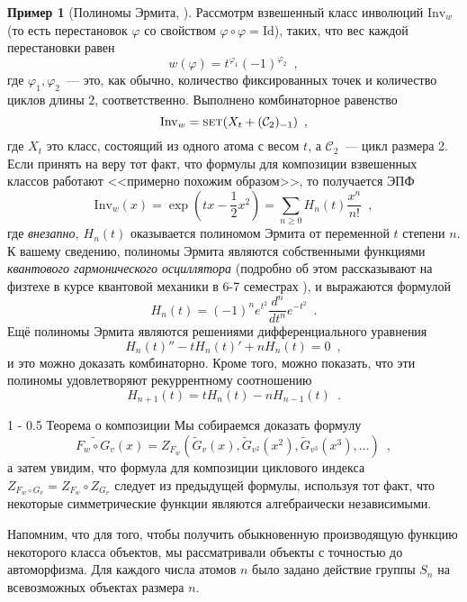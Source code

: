 \documentclass[a5paper]{article}
\makeatletter
\theoremstyle{definition}
\newtheorem{example}{Пример}
\renewcommand{\section}{\@startsection
{section}%
{1}%
{\z@}%
{-\baselineskip}%
{0.5\baselineskip}%
{\centering\large\scshape}} %
\makeatother
\begin{document}
\begin{example}[Полиномы Эрмита, {\cite[Example 16, page 89]{species}}]
    Рассмотрм взвешенный класс инволюций \( \mathrm{Inv}_w \) (то есть
перестановок \( \varphi \) со свойством \( \varphi \circ \varphi = \mathrm{Id}
\)), таких, что вес каждой перестановки равен
\[
    w(\varphi) = t^{\varphi_1} (-1)^{\varphi_2} \enspace ,
\]
где \( \varphi_1, \varphi_2 \)~--- это, как обычно, количество фиксированных
точек и количество циклов длины \( 2 \), соответственно. Выполнено комбинаторное
равенство
\[
    \mathrm{Inv}_w = \text{\textsc{set}}(X_t + (\mathcal C_2)_{-1}) \enspace ,
\]
где \( X_t \) это класс, состоящий из одного атома с весом \( t \), а \(
\mathcal C_2 \)~--- цикл размера 2. Если принять на веру тот факт, что формулы
для композиции взвешенных классов работают <<примерно похожим образом>>, то
получается ЭПФ
\[
    \mathrm{Inv}_w(x) = \exp \left(
        tx - \dfrac12 x^2
    \right) = \sum_{n \geq 0} H_n(t) \dfrac{x^n}{n!} \enspace ,
\]
где \textit{внезапно,} \( H_n(t) \) оказывается полиномом Эрмита от переменной \( t \)
степени \( n \). К вашему сведению, полиномы Эрмита являются собственными
функциями \textit{квантового гармонического осциллятора} (подробно об этом
рассказывают на физтехе в курсе квантовой механики в 6-7 семестрах
\cite[section 4.1]{mipt-quantum}), и выражаются
формулой
\[  
    H_n(t) = (-1)^n e^{t^2} \dfrac{d^n}{dt^n} e^{-t^2}
    \enspace .
\]
Ещё полиномы Эрмита являются решениями дифференциального уравнения
\[
    H_n(t)'' - t H_n(t)' + n H_n(t) = 0 \enspace ,
\]
и это можно доказать комбинаторно. Кроме того, можно показать, что эти полиномы
удовлетворяют рекуррентному соотношению
\[
    H_{n+1} (t) = t H_n(t) - n H_{n-1}(t) \enspace .
\]
\end{example}

\section{Теорема о композиции}
    Мы собираемся доказать формулу
\[
    \widetilde{F_w \circ G_v} (x) = Z_{F_w} (\widetilde G_v(x), \widetilde
G_{v^2}(x^2) ,
\widetilde G_{v^3}(x^3), \ldots ) \enspace ,
\]
а затем увидим, что формула для композиции циклового индекса \( Z_{F_{w} \circ
G_{v}} =
Z_{F_w} \circ Z_{G_v} \) следует из предыдущей формулы, используя тот факт, что
некоторые симметрические функции являются алгебраически независимыми.

Напомним, что для того, чтобы получить обыкновенную производящую функцию
некоторого класса объектов, мы рассматривали объекты с точностью до
автоморфизма. Для каждого числа атомов \( n \) было задано действие группы \(
S_n \) на всевозможных объектах размера \( n
\).
\end{document}

